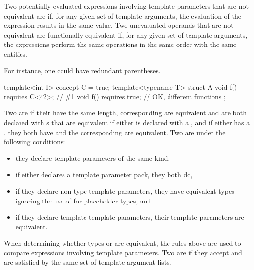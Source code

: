 %
Two potentially-evaluated expressions involving template parameters that are not equivalent are
if, for any given set of template arguments, the evaluation of the
expression results in the same value.
Two unevaluated operands that are not equivalent
are functionally equivalent if, for any given set of template arguments,
the expressions perform
the same operations in the same order with the same entities.
\begin{note}
For instance, one could have redundant parentheses.
\end{note}
\begin{example}
\begin{codeblock}
template<int I> concept C = true;
template<typename T> struct A {
  void f() requires C<42>;      // \#1
  void f() requires true;       // OK, different functions
};
\end{codeblock}
\end{example}

\pnum
Two  are
 if
their  have the same length,
corresponding  are equivalent
and are both declared with s that are equivalent
if either 
is declared with a ,
and if either  has a ,
they both have
 and the corresponding
 are equivalent.
Two  are
under the following conditions:
\begin{itemize}
\item they declare template parameters of the same kind,
\item if either declares a template parameter pack, they both do,
\item if they declare non-type template parameters,
they have equivalent types
ignoring the use of  for placeholder types, and
\item if they declare template template parameters, their template
parameters are equivalent.
\end{itemize}
When determining whether types or 
are equivalent, the rules above are used to compare expressions
involving template parameters.
Two  are
if they accept and are satisfied by
the same set of template argument lists.


